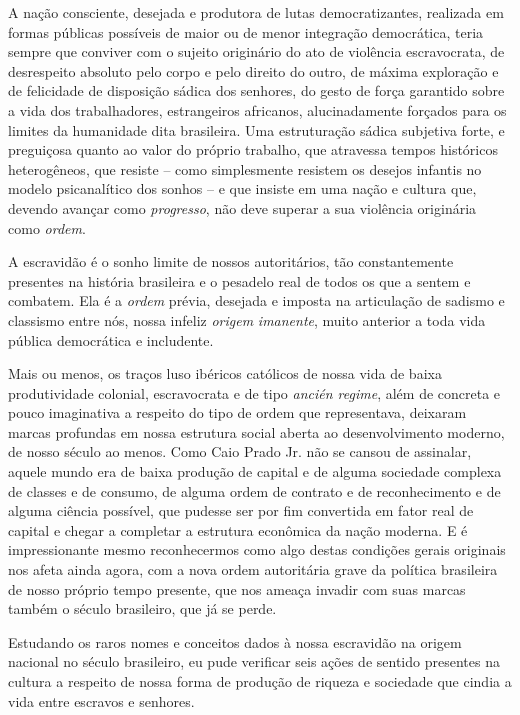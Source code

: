A nação consciente, desejada e produtora de lutas democratizantes,
realizada em formas públicas possíveis de maior ou de menor integração
democrática, teria sempre que conviver com o sujeito originário do ato
de violência escravocrata, de desrespeito absoluto pelo corpo e pelo
direito do outro, de máxima exploração e de felicidade de disposição
sádica dos senhores, do gesto de força garantido sobre a vida dos
trabalhadores, estrangeiros africanos, alucinadamente forçados para os
limites da humanidade dita brasileira. Uma estruturação sádica subjetiva
forte, e preguiçosa quanto ao valor do próprio trabalho, que atravessa
tempos históricos heterogêneos, que resiste -- como simplesmente
resistem os desejos infantis no modelo psicanalítico dos sonhos -- e que
insiste em uma nação e cultura que, devendo avançar como
\emph{progresso}, não deve superar a sua violência originária como
\emph{ordem}.

A escravidão é o sonho limite de nossos autoritários, tão constantemente
presentes na história brasileira e o pesadelo real de todos os que a
sentem e combatem. Ela é a \emph{ordem} prévia, desejada e imposta na
articulação de sadismo e classismo entre nós, nossa infeliz
\emph{origem} \emph{imanente}, muito anterior a toda vida pública
democrática e includente.

Mais ou menos, os traços luso ibéricos católicos de nossa vida de baixa
produtividade colonial, escravocrata e de tipo \emph{ancién regime},
além de concreta e pouco imaginativa a respeito do tipo de ordem que
representava, deixaram marcas profundas em nossa estrutura social aberta
ao desenvolvimento moderno, de nosso século  ao menos. Como Caio Prado
Jr. não se cansou de assinalar, aquele mundo era de baixa produção de
capital e de alguma sociedade complexa de classes e de consumo, de
alguma ordem de contrato e de reconhecimento e de alguma ciência
possível, que pudesse ser por fim convertida em fator real de capital e
chegar a completar a estrutura econômica da nação moderna. E é
impressionante mesmo reconhecermos como algo destas condições gerais
originais nos afeta ainda agora, com a nova ordem autoritária grave da
política brasileira de nosso próprio tempo presente, que nos ameaça
invadir com suas marcas também o século  brasileiro, que já se perde.

Estudando os raros nomes e conceitos dados à nossa escravidão na origem
nacional no século  brasileiro, eu pude verificar seis ações de
sentido presentes na cultura a respeito de nossa forma de produção de
riqueza e sociedade que cindia a vida entre escravos e senhores.

